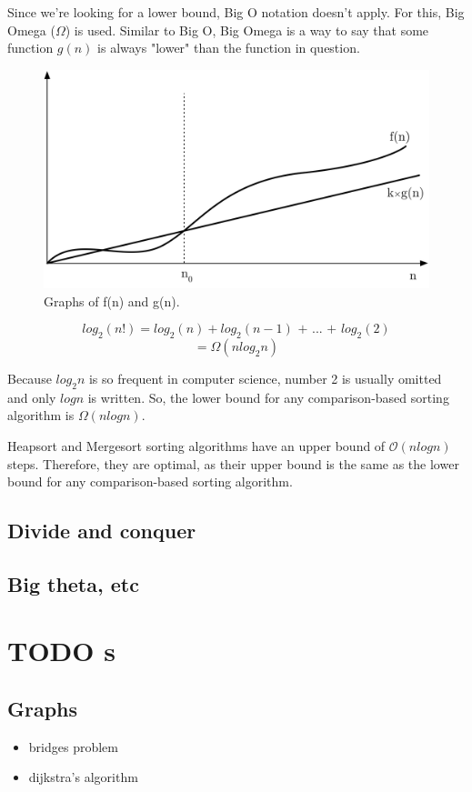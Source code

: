 \documentclass[a4paper, justified, notitlepage, sfsidenotes, notoc]{tufte-book}
\begin{document}
Since we're looking for a lower bound, Big O notation doesn't apply. For this, Big Omega (\(\Omega\)) is used. Similar to Big O, Big Omega is a way to say that some function \(g(n)\) is always "lower" than the function in question.

\begin{figure}[htbp]
\includegraphics[width=.5\linewidth]{./images/big_o_theta_etc/Big_Omega.png}
\caption{\label{}
Graphs of f(n) and g(n).}
\end{figure}
$$ log_{2}(n!) = log_{2}(n) + log_{2}(n-1) \textrm{ + ... + } log_{2}(2) $$
$$ = \Omega(n log_{2}n) $$

Because \(log_{2}n\) is so frequent in computer science, number 2 is usually omitted and only \(logn\) is written. So, the lower bound for any comparison-based sorting algorithm is \(\Omega(n logn)\).

Heapsort and Mergesort sorting algorithms have an upper bound of \(\mathcal{O}(nlogn)\) steps. Therefore, they are optimal, as their upper bound is the same as the lower bound for any comparison-based sorting algorithm.
\chapter{Divide and conquer}
\label{sec:orgeaa0a91}
\chapter{Big theta, etc}
\label{sec:org75e19a6}

\part{{\bfseries\sffamily TODO} s}
\label{sec:org3973052}
\chapter{Graphs}
\label{sec:orgae72d43}
\begin{itemize}
\item bridges problem
\item dijkstra's algorithm
\end{itemize}
\end{document}

